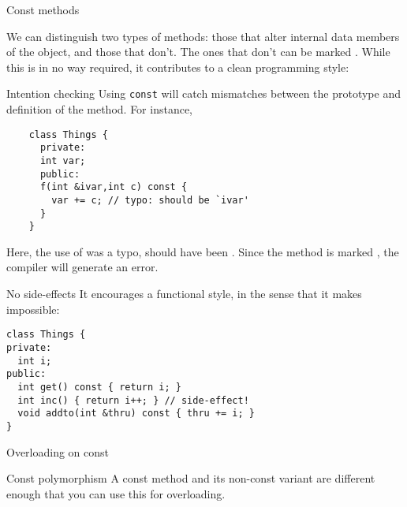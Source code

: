  {Const methods}

We can distinguish two types of methods: those that alter internal
data members of the object, and those that don't. The ones that don't
can be marked .
While this is in no way required, it contributes to a clean
programming style:

\begin{block}{Intention checking}
  Using \lstinline{const} will catch mismatches between the prototype
  and definition of the method. For instance,
  \begin{lstlisting}
    class Things {
      private:
      int var;
      public:
      f(int &ivar,int c) const {
        var += c; // typo: should be `ivar'
      }
    }
  \end{lstlisting}
\end{block}

Here, the use of  was a typo, should have been . Since
the method is marked , the compiler will generate an error.

\begin{block}{No side-effects}
  \label{sl:const-sideeffect}
  It encourages a functional style, in the sense that it makes
   impossible:
\begin{lstlisting}
class Things {
private:
  int i;
public:
  int get() const { return i; }
  int inc() { return i++; } // side-effect!
  void addto(int &thru) const { thru += i; }
}
\end{lstlisting}
\end{block}

\begin{comment}
\item It allows the compiler to optimize your code. For instance:
  \begin{lstlisting}
    class Things {
      public:
      int f() const { /* ... */ };
      int g() const { /* ... */ };
    }
    ...
    Things t;
    int x,y,z;
    x = t.f();
    y = t.g();
    z = t.f();
  \end{lstlisting}
  Since the methods did not alter the object, the compiler can conclude
  that \n{x,z} are the same, and skip the calculation for~\n{z}.
\end{comment}

 {Overloading on const}

\begin{block}{Const polymorphism}
  \label{sl:const-poly}
  A const method and its non-const variant are different enough that you
  can use this for overloading.
\end{block}

